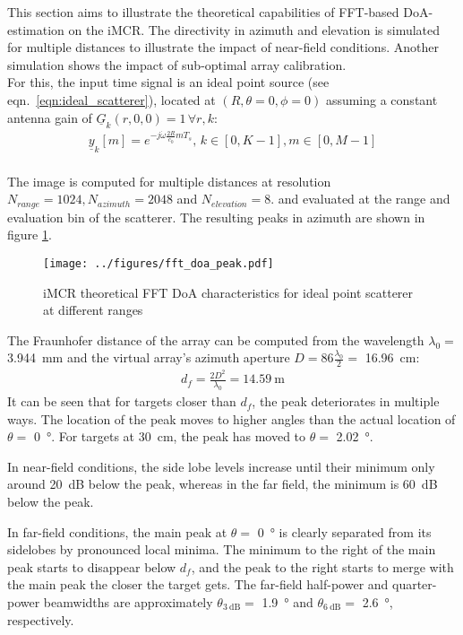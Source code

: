 This section aims to illustrate the theoretical capabilities of FFT-based DoA-estimation on the iMCR.
The directivity in azimuth and elevation is simulated for multiple distances to illustrate the impact of near-field conditions.
Another simulation shows the impact of sub-optimal array calibration. \\

For this, the input time signal is an ideal point source (see eqn.\ \ref{eqn:ideal_scatterer}),
located at $(R,\theta=0,\phi=0)$
assuming a constant antenna gain of $\underline G_k(r,0,0)=1 \,\forall r,k$:
\begin{align}
    \underline y_k[m] =  e^{-j\dot \omega \frac{2R}{c_0} m T_s}
    ,\,k\in[0,K-1],m\in[0,M-1]
\end{align}
\\
The image is computed for multiple distances at resolution
$N_{range} = 1024, N_{azimuth} = 2048$ and $N_{elevation} = 8$.
and evaluated at the range and evaluation bin of the scatterer.
The resulting peaks in azimuth are shown in figure \ref{fig:fft_doa_peak}.
\begin{figure}[h]
    \centering
    \texttt{[image: ../figures/fft\_doa\_peak.pdf]}
    \caption{iMCR theoretical FFT DoA characteristics for ideal point scatterer at different ranges}
    \label{fig:fft_doa_peak}
\end{figure}

The Fraunhofer distance of the array can be computed from the wavelength $\lambda_0=$ \SIlist{3.944}{\mm}
and the virtual array's azimuth aperture $D = 86 \frac{\lambda_0}{2}=$ \SI{16.96}{\cm}:
\begin{align}
    d_f  = \frac{2D^2}{\lambda_0}
    = \SI{14.59}{\m}
\end{align}
It can be seen that for targets closer than $d_f$, the peak deteriorates in multiple ways.
The location of the peak moves to higher angles than the actual location of $\theta =$ \SI{0}{\degree}.
For targets at \SI{30}{\cm}, the peak has moved to $\theta =$ \SI{2.02}{\degree}.

In near-field conditions, the side lobe levels increase until their minimum only around \SI{20}{\dB} below the peak,
whereas in the far field, the minimum is \SI{60}{\dB} below the peak.

In far-field conditions, the main peak at $\theta =$ \SI{0}{\degree}
is clearly separated from its sidelobes by pronounced local minima.
The minimum to the right of the main peak starts to disappear below $d_f$,
and the peak to the right starts to merge with the main peak the closer the target gets.
The far-field half-power and quarter-power beamwidths are approximately
$\theta_{\SI{3}{\dB}}=$ \SI{1.9}{\degree} and $\theta_{\SI{6}{\dB}}=$ \SI{2.6}{\degree}, respectively.

